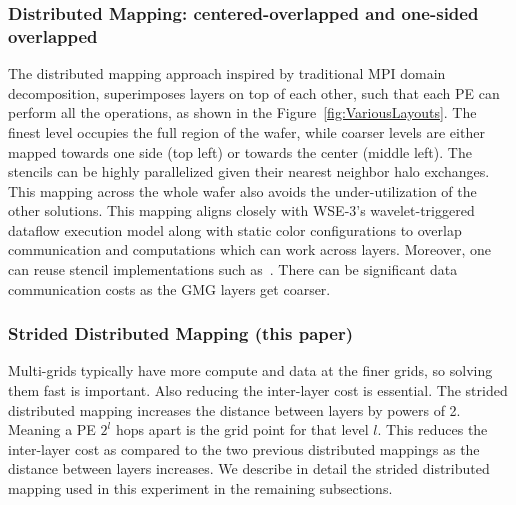 \documentclass[sigconf]{acmart}
\begin{document}
    \subsubsection{Distributed Mapping: centered-overlapped and one-sided overlapped}
            The distributed mapping approach inspired by traditional MPI domain decomposition, superimposes layers on top of each other, such that each PE can perform all the operations, as shown in the Figure~\ref{fig:VariousLayouts}.
            The finest level occupies the full region of the wafer, while coarser levels are either mapped towards one side (top left) or towards the center (middle left). The stencils can be highly parallelized given their nearest neighbor halo exchanges. This mapping across the whole wafer also avoids the under-utilization of the other solutions.  This mapping aligns closely with WSE-3's wavelet-triggered dataflow execution model along with static color configurations to overlap communication and computations which can work across layers. Moreover, one can reuse stencil implementations such as~\cite{Rocki,mathias}.  %
            There can be significant data communication costs as the GMG layers get coarser. %
            
    \subsubsection{Strided Distributed Mapping (this paper)}
            Multi-grids typically have more compute and data at the finer grids, so solving them fast is important. Also reducing the inter-layer cost is essential. The strided distributed mapping 
            increases the distance between layers by powers of 2. Meaning a PE $2^l$ hops apart is the grid point for that level $l$. This reduces the inter-layer cost as compared to the two previous distributed mappings as the distance between layers increases. %
            We describe in detail the strided distributed mapping used in this experiment in the remaining subsections. %
            
\end{document}
